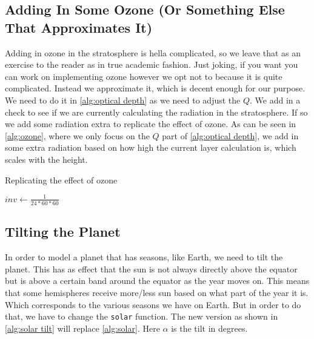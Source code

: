 \subsection{Adding In Some Ozone (Or Something Else That Approximates It)}
Adding in ozone in the stratosphere is hella complicated, so we leave that as an exercise to the reader as in true academic fashion. Just joking, if you want you can work on implementing ozone 
however we opt not to because it is quite complicated. Instead we approximate it, which is decent enough for our purpose. We need to do it in \autoref{alg:optical depth} as we need to adjust the
$Q$. We add in a check to see if we are currently calculating the radiation in the stratosphere. If so we add some radiation extra to replicate the effect of ozone. As can be seen in 
\autoref{alg:ozone}, where we only focus on the $Q$ part of \autoref{alg:optical depth}, we add in some extra radiation based on how high the current layer calculation is, which scales with the
height. 

\begin{algorithm}
    \caption{Replicating the effect of ozone}
    \label{alg:ozone}
    $inv \leftarrow \frac{1}{24*60*60}$ \;
\end{algorithm}

\subsection{Tilting the Planet}
In order to model a planet that has seasons, like Earth, we need to tilt the planet. This has as effect that the sun is not always directly above the equator but is above a certain band around
the equator as the year moves on. This means that some hemispheres receive more/less sun based on what part of the year it is. Which corresponds to the various seasons we have on Earth. But in
order to do that, we have to change the \texttt{solar} function. The new version as shown in \autoref{alg:solar tilt} will replace \autoref{alg:solar}. Here $\alpha$ is the tilt in degrees.

